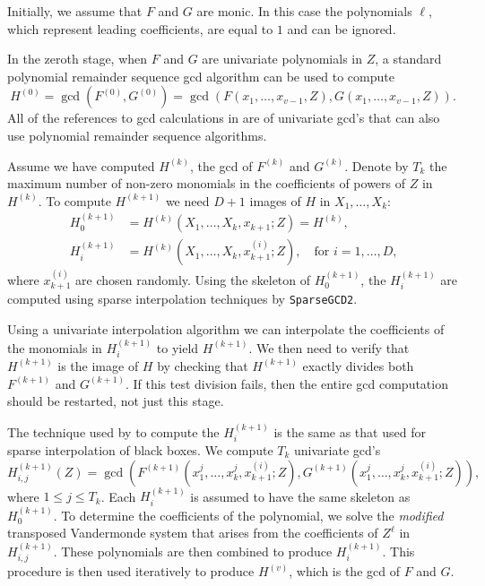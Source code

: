 Initially, we assume that $F$ and $G$ are monic.  In this case
the polynomials $\ell$, which represent leading coefficients, are
equal to $1$ and can be ignored.

In the zeroth stage, when $F$ and $G$ are univariate polynomials
in $Z$, a standard polynomial remainder sequence {\sc gcd} algorithm
can be used to compute
\[
H^{(0)} = \gcd(F^{(0)}, G^{(0)}) = 
\gcd(F(x_1, \ldots, x_{v-1}, Z), G(x_1, \ldots, x_{v-1}, Z)).
\]
All of the references to {\sc gcd} calculations in
 are of univariate {\sc gcd}'s that can also use
polynomial remainder sequence algorithms.

Assume we have computed $H^{(k)}$, the {\sc gcd} of $F^{(k)}$ and $G^{(k)}$.
Denote by $T_k$ the maximum number of non-zero monomials in the
coefficients of powers of $Z$ in $H^{(k)}$.  To compute $H^{(k+1)}$ we
need $D+1$ images of $H$ in $X_1, \ldots, X_k$:
\[
\begin{aligned}
H^{(k+1)}_0 & = H^{(k)}(X_1, \ldots, X_{k}, x_{k+1}; Z) = H^{(k)}, \\
H^{(k+1)}_i & = H^{(k)}(X_1, \ldots, X_{k}, x^{(i)}_{k+1}; Z),
\quad\mbox{for $i = 1, \ldots, D$,}
\end{aligned}
\]
where $x^{(i)}_{k+1}$ are chosen randomly.  Using the skeleton of
$H^{(k+1)}_0$, the $H^{(k+1)}_i$ are computed using sparse
interpolation techniques by {\tt SparseGCD2}.

Using a univariate interpolation algorithm we can interpolate the
coefficients of the monomials in $H^{(k+1)}_i$ to yield $H^{(k+1)}$.
We then need to verify that $H^{(k+1)}$ is the image of $H$ by
checking that $H^{(k+1)}$ exactly divides both $F^{(k+1)}$ and
$G^{(k+1)}$.  If this test division fails, then the entire {\sc gcd}
computation should be restarted, not just this stage.

The technique used by  to compute the $H^{(k+1)}_i$
is the same as that used for sparse interpolation of black boxes.  We
compute $T_k$ univariate {\sc gcd}'s
\[
H^{(k+1)}_{i,j}(Z) = 
\gcd(F^{(k+1)}(x_1^j, \ldots, x_k^j, x_{k+1}^{(i)}; Z), 
G^{(k+1)}(x_1^j, \ldots, x_k^j, x_{k+1}^{(i)}; Z)),
\]
where $1 \le j \le T_k$.  Each $H^{(k+1)}_i$ is assumed to have the
same skeleton as $H^{(k+1)}_0$.  To determine the coefficients of the
polynomial, we solve the {\em modified} transposed Vandermonde system
that arises from the coefficients of $Z^{\ell}$ in $H^{(k+1)}_{i,j}$.
These polynomials are then combined to produce $H^{(k+1)}_i$.  This
procedure is then used iteratively to produce $H^{(v)}$, which is the
{\sc gcd} of $F$ and $G$.

